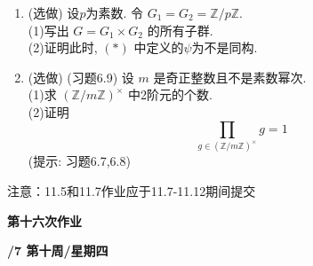\documentclass[a4paper,12pt]{article}
\begin{document}
\begin{enumerate}
    \item {\color{red} (选做)} 设$p$为素数. 令 $G_1=G_2=\mathbb{Z}/p\mathbb{Z}$. \\
    (1)\quad 写出 $G=G_1\times G_2$ 的所有子群.\\
    (2)\quad 证明此时, $(*)$ 中定义的$\psi$为不是同构.

    \item {\color{red} (选做)} (习题6.9) 设 $m$ 是奇正整数且不是素数幂次.\\
    (1)\quad 求 $(\mathbb{Z}/m\mathbb{Z})^\times$ 中2阶元的个数.\\
    (2)\quad 证明
    $$ \prod_{g\in(\mathbb{Z}/m\mathbb{Z})^\times} g=1$$
    ({\color{blue}提示: 习题6.7,6.8})
    
\end{enumerate}

{\color{red} 注意：11.5和11.7作业应于11.7-11.12期间提交}


\newpage
\head

\begin{center} %
	{\Large \bf 第十六次作业} %
	\vspace{2mm}
	
	{\bf{}/7 \quad  第十周/星期四} %
\end{center} 
\end{document}
